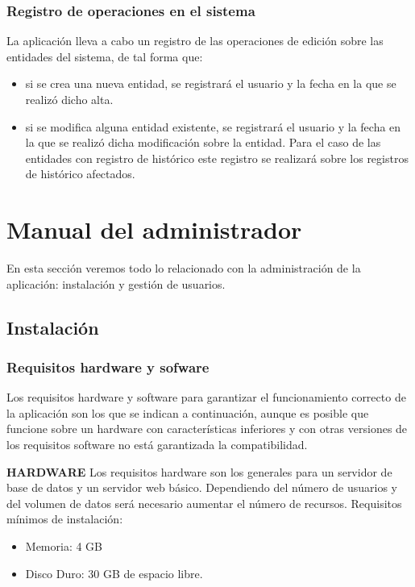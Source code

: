\subsubsection{Registro de operaciones en el sistema}
\label{sub:registro-operaciones}

La aplicación lleva a cabo un registro de las operaciones de edición sobre las entidades del sistema, de tal forma que:

\begin{itemize}
\item si se crea una nueva entidad, se registrará el usuario y la fecha en la que se realizó dicho alta.
\item si se modifica alguna entidad existente, se registrará el usuario y la fecha en la que se realizó dicha modificación sobre la entidad. Para el caso de las entidades con registro de histórico este registro se realizará sobre los registros de histórico afectados.
\end{itemize}


\section{Manual del administrador}
\label{sec:manual-administrador}

En esta sección veremos todo lo relacionado con la administración de la aplicación: instalación y gestión de usuarios.

\subsection{Instalación}
\label{sub:instalacion}

\subsubsection{Requisitos hardware y sofware}
\label{sub:requisitos}

Los requisitos hardware y software para garantizar el funcionamiento correcto de
la aplicación son los que se indican a continuación, aunque es posible que funcione
sobre un hardware con características inferiores y con otras versiones de los requisitos
software no está garantizada la compatibilidad.

\textbf{HARDWARE}\newline
Los requisitos hardware son los generales para un servidor de base de datos y un
servidor web básico. Dependiendo del número de usuarios y del volumen de datos será
necesario aumentar el número de recursos.
Requisitos mínimos de instalación:
\begin{itemize}
\item Memoria: 4 GB
\item Disco Duro: 30 GB de espacio libre.
\end{itemize}


